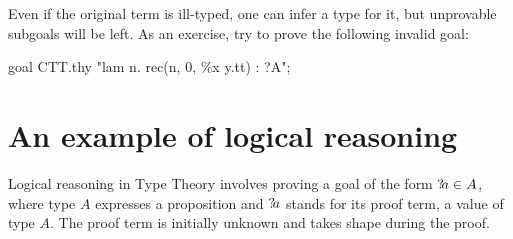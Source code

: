 Even if the original term is ill-typed, one can infer a type for it, but
unprovable subgoals will be left.  As an exercise, try to prove the
following invalid goal:
\begin{ttbox}
goal CTT.thy "lam n. rec(n, 0, \%x y.tt) : ?A";
\end{ttbox}



\section{An example of logical reasoning}
Logical reasoning in Type Theory involves proving a goal of the form
${?\!a}\in A$, where type $A$ expresses a proposition and ${?\!a}$ stands
for its proof term, a value of type $A$.  The proof term is initially
unknown and takes shape during the proof.  

